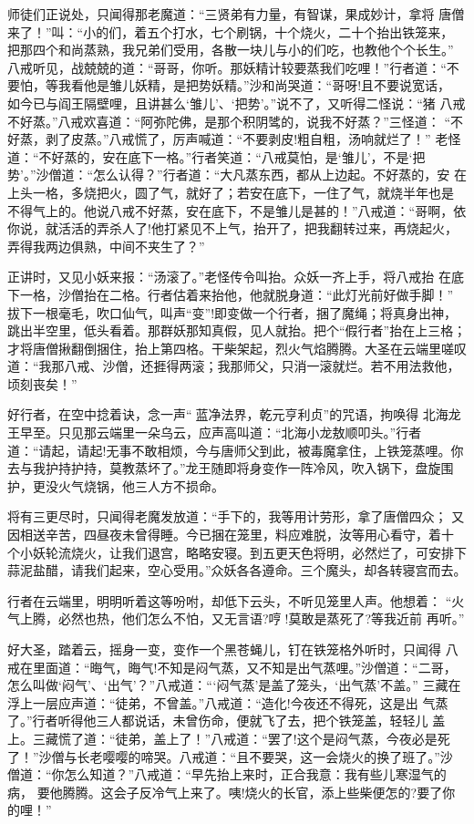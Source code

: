 师徒们正说处，只闻得那老魔道：“三贤弟有力量，有智谋，果成妙计，拿将
唐僧来了！”叫：“小的们，着五个打水，七个刷锅，十个烧火，二十个抬出铁笼来，
把那四个和尚蒸熟，我兄弟们受用，各散一块儿与小的们吃，也教他个个长生。”
八戒听见，战兢兢的道：“哥哥，你听。那妖精计较要蒸我们吃哩！”行者道：“不
要怕，等我看他是雏儿妖精，是把势妖精。”沙和尚哭道：“哥呀!且不要说宽话，
如今已与阎王隔壁哩，且讲甚么‘雏儿’、‘把势’。”说不了，又听得二怪说：“猪
八戒不好蒸。”八戒欢喜道：“阿弥陀佛，是那个积阴骘的，说我不好蒸？”三怪道：
“不好蒸，剥了皮蒸。”八戒慌了，厉声喊道：“不要剥皮!粗自粗，汤响就烂了！”
老怪道：“不好蒸的，安在底下一格。”行者笑道：“八戒莫怕，是‘雏儿’，不是‘把
势’。”沙僧道：“怎么认得？”行者道：“大凡蒸东西，都从上边起。不好蒸的，安
在上头一格，多烧把火，圆了气，就好了；若安在底下，一住了气，就烧半年也是
不得气上的。他说八戒不好蒸，安在底下，不是雏儿是甚的！”八戒道：“哥啊，依
你说，就活活的弄杀人了!他打紧见不上气，抬开了，把我翻转过来，再烧起火，
弄得我两边俱熟，中间不夹生了？”

正讲时，又见小妖来报：“汤滚了。”老怪传令叫抬。众妖一齐上手，将八戒抬
在底下一格，沙僧抬在二格。行者估着来抬他，他就脱身道：“此灯光前好做手脚！”
拔下一根毫毛，吹口仙气，叫声“变”!即变做一个行者，捆了魔绳；将真身出神，
跳出半空里，低头看着。那群妖那知真假，见人就抬。把个“假行者”抬在上三格；
才将唐僧揪翻倒捆住，抬上第四格。干柴架起，烈火气焰腾腾。大圣在云端里嗟叹
道：“我那八戒、沙僧，还捱得两滚；我那师父，只消一滚就烂。若不用法救他，
顷刻丧矣！”

好行者，在空中捻着诀，念一声“蓝净法界，乾元亨利贞”的咒语，拘唤得
北海龙王早至。只见那云端里一朵乌云，应声高叫道：“北海小龙敖顺叩头。”行者
道：“请起，请起!无事不敢相烦，今与唐师父到此，被毒魔拿住，上铁笼蒸哩。你
去与我护持护持，莫教蒸坏了。”龙王随即将身变作一阵冷风，吹入锅下，盘旋围
护，更没火气烧锅，他三人方不损命。

将有三更尽时，只闻得老魔发放道：“手下的，我等用计劳形，拿了唐僧四众；
又因相送辛苦，四昼夜未曾得睡。今已捆在笼里，料应难脱，汝等用心看守，着十
个小妖轮流烧火，让我们退宫，略略安寝。到五更天色将明，必然烂了，可安排下
蒜泥盐醋，请我们起来，空心受用。”众妖各各遵命。三个魔头，却各转寝宫而去。

行者在云端里，明明听着这等吩咐，却低下云头，不听见笼里人声。他想着：
“火气上腾，必然也热，他们怎么不怕，又无言语?哼!莫敢是蒸死了?等我近前
再听。”

好大圣，踏着云，摇身一变，变作一个黑苍蝇儿，钉在铁笼格外听时，只闻得
八戒在里面道：“晦气，晦气!不知是闷气蒸，又不知是出气蒸哩。”沙僧道：“二哥，
怎么叫做‘闷气’、‘出气’？”八戒道：“‘闷气蒸’是盖了笼头，‘出气蒸’不盖。”
三藏在浮上一层应声道：“徒弟，不曾盖。”八戒道：“造化!今夜还不得死，这是出
气蒸了。”行者听得他三人都说话，未曾伤命，便就飞了去，把个铁笼盖，轻轻儿
盖上。三藏慌了道：“徒弟，盖上了！”八戒道：“罢了!这个是闷气蒸，今夜必是死
了！”沙僧与长老嘤嘤的啼哭。八戒道：“且不要哭，这一会烧火的换了班了。”沙
僧道：“你怎么知道？”八戒道：“早先抬上来时，正合我意：我有些儿寒湿气的病，
要他腾腾。这会子反冷气上来了。咦!烧火的长官，添上些柴便怎的?要了你的哩！”

